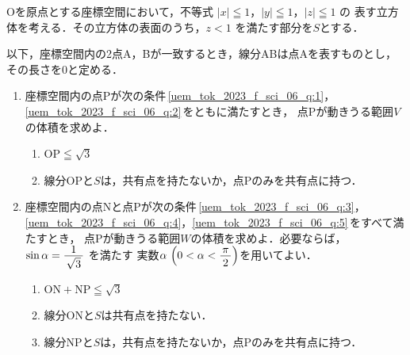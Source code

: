 ﻿\documentclass[../../../uem_tok_q.tex]{subfiles}
\begin{document}
    Oを原点とする座標空間において，不等式 $|x|\leqq 1$，$|y|\leqq 1$，$|z|\leqq 1$ の%
    表す立方体を考える．その立方体の表面のうち，$z<1$ を満たす部分を$S$とする．

    以下，座標空間内の2点A，Bが一致するとき，線分ABは点Aを表すものとし，%
    その長さを0と定める．

    \begin{enumerate}
        \item 座標空間内の点Pが次の条件\,\ref{uem_tok_2023_f_sci_06_q:1}，%
            \ref{uem_tok_2023_f_sci_06_q:2}\,をともに満たすとき，%
            点Pが動きうる範囲$V$の体積を求めよ．
            \begin{enumerate}
                \item $\mathrm{OP}\leqq\sqrt{3}$
                    \label{uem_tok_2023_f_sci_06_q:1}
                \item 線分OPと$S$は，共有点を持たないか，点Pのみを共有点に持つ．
                    \label{uem_tok_2023_f_sci_06_q:2}
            \end{enumerate}
        \item 座標空間内の点Nと点Pが次の条件\,\ref{uem_tok_2023_f_sci_06_q:3}，%
            \ref{uem_tok_2023_f_sci_06_q:4}，\ref{uem_tok_2023_f_sci_06_q:5}\,をすべて満たすとき，%
            点Pが動きうる範囲$W$の体積を求めよ．必要ならば，%
            $\sin\alpha=\myfraca{1}{\sqrt{3}}$ を満たす%
            実数$\alpha\,\left(0<\alpha<\myfraca{\pi}{2}\right)$を用いてよい．
            \begin{enumerate}[resume]
                \item $\mathrm{ON}+\mathrm{NP}\leqq\sqrt{3}$
                    \label{uem_tok_2023_f_sci_06_q:3}
                \item 線分ONと$S$は共有点を持たない．
                    \label{uem_tok_2023_f_sci_06_q:4}
                \item 線分NPと$S$は，共有点を持たないか，点Pのみを共有点に持つ．
                    \label{uem_tok_2023_f_sci_06_q:5}
            \end{enumerate}
    \end{enumerate}
\end{document}
